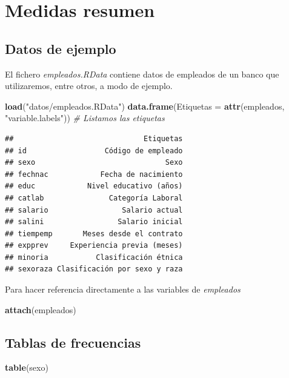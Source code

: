 \documentclass[]{book}
\newenvironment{Shaded}{\begin{snugshade}}{\end{snugshade}}
\newcommand{\KeywordTok}[1]{\textcolor[rgb]{0.13,0.29,0.53}{\textbf{#1}}}
\newcommand{\DataTypeTok}[1]{\textcolor[rgb]{0.13,0.29,0.53}{#1}}
\newcommand{\StringTok}[1]{\textcolor[rgb]{0.31,0.60,0.02}{#1}}
\newcommand{\CommentTok}[1]{\textcolor[rgb]{0.56,0.35,0.01}{\textit{#1}}}
\newcommand{\NormalTok}[1]{#1}
\begin{document}
\section{Medidas resumen}\label{medidas-resumen}

\subsection{Datos de ejemplo}\label{datos-de-ejemplo}

El fichero \emph{empleados.RData} contiene datos de empleados de un
banco que utilizaremos, entre otros, a modo de ejemplo.

\begin{Shaded}
\begin{Highlighting}[]
\KeywordTok{load}\NormalTok{(}\StringTok{"datos/empleados.RData"}\NormalTok{)}
\KeywordTok{data.frame}\NormalTok{(}\DataTypeTok{Etiquetas =} \KeywordTok{attr}\NormalTok{(empleados, }\StringTok{"variable.labels"}\NormalTok{))  }\CommentTok{# Listamos las etiquetas}
\end{Highlighting}
\end{Shaded}

\begin{verbatim}
##                              Etiquetas
## id                  Código de empleado
## sexo                              Sexo
## fechnac            Fecha de nacimiento
## educ            Nivel educativo (años)
## catlab               Categoría Laboral
## salario                 Salario actual
## salini                 Salario inicial
## tiempemp       Meses desde el contrato
## expprev     Experiencia previa (meses)
## minoria           Clasificación étnica
## sexoraza Clasificación por sexo y raza
\end{verbatim}

Para hacer referencia directamente a las variables de \emph{empleados}

\begin{Shaded}
\begin{Highlighting}[]
\KeywordTok{attach}\NormalTok{(empleados)}
\end{Highlighting}
\end{Shaded}

\subsection{Tablas de frecuencias}\label{tablas-de-frecuencias}

\begin{Shaded}
\begin{Highlighting}[]
\KeywordTok{table}\NormalTok{(sexo)}
\end{Highlighting}
\end{Shaded}
\end{document}
